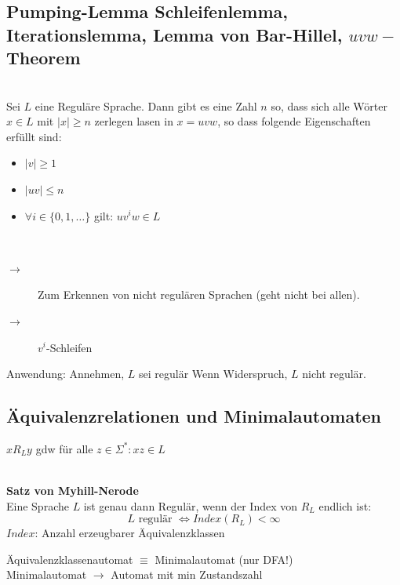 \documentclass{scrartcl}
\begin{document}
\subsection*{Pumping-Lemma {\tiny Schleifenlemma, Iterationslemma, Lemma von Bar-Hillel, $uvw-$Theorem}} %
\begin{shaded}
    \ \\Sei $L$ eine Reguläre Sprache. Dann gibt es eine Zahl $n$ so, dass sich alle Wörter $x\in L$ mit $|x|\geq n$ zerlegen lasen in $x=uvw$, so dass folgende Eigenschaften erfüllt sind:
    \begin{minipage}{0.48\textwidth}
        \begin{itemize}
            \item $|v|\geq1$
            \item $|uv|\leq n$
            \item $\forall i\in\{0,1,\dots\}$ gilt: $uv^iw\in L$
        \end{itemize}
    \end{minipage}
    \hfill \vrule \hfill
    \begin{minipage}{0.48\textwidth}
        \begin{center}
        \ \\[.5cm]
        \scalebox{0.75}{}
        \end{center}
    \end{minipage}
\end{shaded}
\begin{description}
    \item[$\to$] Zum Erkennen von nicht regulären Sprachen (geht nicht bei allen).
    \item[$\to$] $v^i$-Schleifen
\end{description}
Anwendung: Annehmen, $L$ sei regulär \follows Wenn Widerspruch, $L$ nicht regulär.

\subsection*{Äquivalenzrelationen und Minimalautomaten}
$xR_Ly$ gdw für alle $z\in\Sigma^*: xz\in L$
\begin{shaded}
    \ \\\textbf{Satz von Myhill-Nerode} \\
    Eine Sprache $L$ ist genau dann Regulär, wenn der Index von $R_L$ endlich ist:
    \[L \textrm{ regulär } \Leftrightarrow Index(R_L) < \infty \]
    {\tiny $Index$: Anzahl erzeugbarer Äquivalenzklassen}
\end{shaded}
Äquivalenzklassenautomat $\equiv$ Minimalautomat (nur DFA!) \\
Minimalautomat $\to$ Automat mit min Zustandszahl
\end{document}
